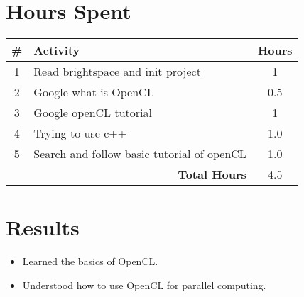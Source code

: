 \documentclass{article}
\begin{document}
\section*{Hours Spent}
\begin{tabular}{|c|l|c|}
    \hline
    \# & Activity & Hours \\
    \hline
    1 & Read brightspace and init project & 1 \\
    2 & Google what is OpenCL & 0.5 \\
    3 & Google openCL tutorial & 1 \\
    4 & Trying to use c++ & 1.0 \\
    5 & Search and follow basic tutorial of openCL & 1.0 \\
    \hline
    \multicolumn{2}{|r|}{\textbf{Total Hours}} & 4.5 \\
    \hline
\end{tabular}

\section*{Results}
\begin{itemize}
    \item Learned the basics of OpenCL.
    \item Understood how to use OpenCL for parallel computing.
\end{itemize}
\end{document}
